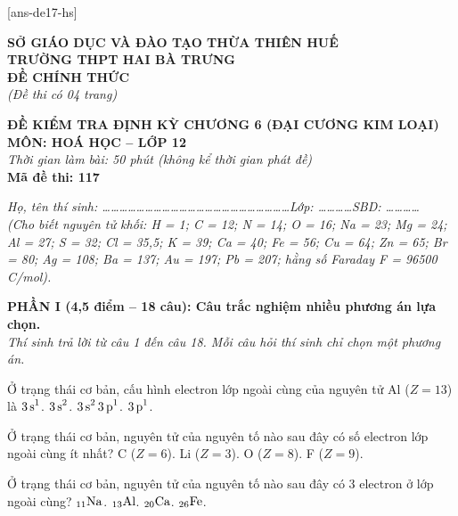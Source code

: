 \documentclass[11pt,a4paper]{article}
\def\loigiai#1{}
\begin{document}
[ans-de17-hs]

\noindent
\begin{minipage}[t]{0.48\textwidth}
	\textbf{SỞ GIÁO DỤC VÀ ĐÀO TẠO THỪA THIÊN HUẾ}\\
	\textbf{TRƯỜNG THPT HAI BÀ TRƯNG}\\
	\textbf{ĐỀ CHÍNH THỨC}\\
	\textit{(Đề thi có 04 trang)}
\end{minipage}\hfill
\begin{minipage}[t]{0.48\textwidth}
	\raggedleft
	\textbf{\color{mainGreen}ĐỀ KIỂM TRA ĐỊNH KỲ CHƯƠNG 6 (ĐẠI CƯƠNG KIM LOẠI)}\\
	\textbf{MÔN: HOÁ HỌC -- LỚP 12}\\
	\textit{Thời gian làm bài: 50 phút (không kể thời gian phát đề)}\\
	\textbf{Mã đề thi: 117}
\end{minipage}


\vspace{1pt}
\noindent\textit{Họ, tên thí sinh: \dots\dots\dots\dots\dots\dots\dots\dots\dots\dots\dots\dots\dots\dots\dots\dots\dots\dots\dots\dots\dots\dots Lớp: \dots\dots\dots\dots SBD: \dots\dots\dots\dots}\\
\noindent\textit{(Cho biết nguyên tử khối: H = 1; C = 12; N = 14; O = 16; Na = 23; Mg = 24; Al = 27; S = 32; Cl = 35,5; K = 39; Ca = 40; Fe = 56; Cu = 64; Zn = 65; Br = 80; Ag = 108; Ba = 137; Au = 197; Pb = 207; hằng số Faraday F = 96500 C/mol).}

\vspace{2pt}
\noindent
\textbf{PHẦN I (4,5 điểm -- 18 câu): Câu trắc nghiệm nhiều phương án lựa chọn.}\\
\textit{Thí sinh trả lời từ câu 1 đến câu 18. Mỗi câu hỏi thí sinh chỉ chọn một phương án.}

\setcounter{ex}{0}

\begin{ex}
Ở trạng thái cơ bản, cấu hình electron lớp ngoài cùng của nguyên tử Al ($Z = 13$) là
\choice
{$\ce{3s^1}$.}
{$\ce{3s^2}$.}
{$\ce{3s^2 3p^1}$.}
{$\ce{3p^1}$.}
\loigiai{}
\end{ex}

\begin{ex}
Ở trạng thái cơ bản, nguyên tử của nguyên tố nào sau đây có số electron lớp ngoài cùng ít nhất?
\choice
{C ($Z = 6$).}
{Li ($Z = 3$).}
{O ($Z = 8$).}
{F ($Z = 9$).}
\loigiai{}
\end{ex}

\begin{ex}
Ở trạng thái cơ bản, nguyên tử của nguyên tố nào sau đây có 3 electron ở lớp ngoài cùng?
\choice
{$_{11}\ce{Na}$.}
{$_{13}\ce{Al}$.}
{$_{20}\ce{Ca}$.}
{$_{26}\ce{Fe}$.}
\loigiai{}
\end{ex}
\end{document}
